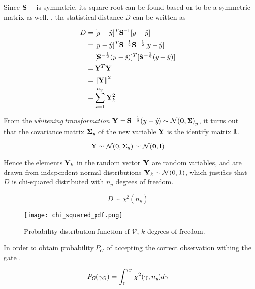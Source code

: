 Since $\mathbf{S}^{-1}$ is symmetric, its square root can be found based on  to be a symmetric matrix as well. , the statistical distance $D$ can be written as

\begin{align}
D &= [{y}-{\hat{{y}}}]^T \mathbf{S}^{-1} [{y}-{\hat{{y}}}] \\
 &= [{y}-{\hat{{y}}}]^T \mathbf{S}^{-\frac{1}{2}} \mathbf{S}^{-\frac{1}{2}} [{y}-{\hat{{y}}}] \\
 &= [\mathbf{S}^{-\frac{1}{2}}({y}-{\hat{{y}}})]^T [\mathbf{S}^{-\frac{1}{2}}({y}-{\hat{{y}}})] \\
 &= \mathbf{Y}^T \mathbf{Y} \\
 &= \left\lVert\mathbf{Y}\right\rVert^2 \\
 &= \sum_{k=1}^{n_y} \mathbf{Y}_k^2
\end{align}

From the \emph{whitening transformation} $ \mathbf{Y} = \mathbf{S}^{-\frac{1}{2}}({y}-{\hat{{y}}}) \sim \mathcal{N}(\mathbf{0},\mathbf{\Sigma)}_y$, it turns out that the covariance matrix $\mathbf{\Sigma}_y$ of the new variable $\mathbf{Y}$ is the identify matrix $\mathbf{I}$.


$$ \mathbf{Y} \sim \mathcal{N}(0,\mathbf{\Sigma}_y) \sim \mathcal{N}(\mathbf{0},\mathbf{I}) $$

Hence the elements $\mathbf{Y}_k$ in the random vector $\mathbf{Y}$ are random variables, and are drawn from independent normal distributions $\mathbf{Y}_k \sim \mathcal{N}(0,1)$, which justifies that $D$ is chi-squared distributed with $n_y$ degrees of freedom.

\begin{equation}\label{key}
D \sim \chi^2(n_y)
\end{equation}




\begin{figure}[H]
	\centering
	\texttt{[image: chi\_squared\_pdf.png]}
	\caption{Probability distribution function of $\mathcal{V}$, $k$ degrees of freedom.}
	\label{fig:chisquared}
\end{figure}


In order to obtain probability $P_G$ of accepting the correct observation withing the gate , 

\begin{equation}\label{eq:gatingprobability}
P_G({\gamma_G}) = \int_{0}^{{\gamma_G}} \chi^2(\gamma, n_y)d\gamma
\end{equation}

